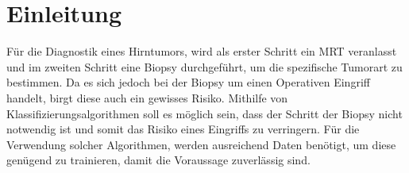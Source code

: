 \chapter{Einleitung}

Für die Diagnostik eines Hirntumors, wird als erster Schritt ein MRT veranlasst und im zweiten Schritt eine Biopsy 
durchgeführt, um die spezifische Tumorart zu bestimmen.
Da es sich jedoch bei der Biopsy um einen Operativen Eingriff handelt, birgt diese auch ein gewisses Risiko.
Mithilfe von Klassifizierungsalgorithmen soll es möglich sein, dass der Schritt der Biopsy nicht notwendig ist 
und somit das Risiko eines Eingriffs  zu verringern.
Für die Verwendung solcher Algorithmen, werden ausreichend Daten benötigt, um diese genügend zu trainieren, damit die 
Voraussage zuverlässig sind. 

